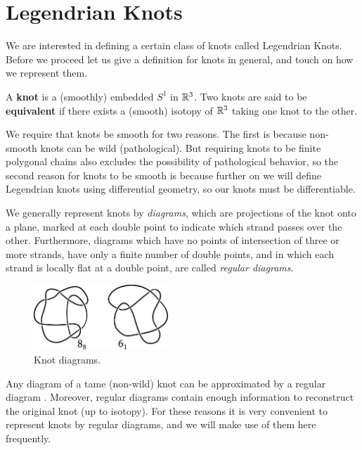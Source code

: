 \section{Legendrian Knots}

We are interested in defining a certain class of knots called Legendrian Knots. Before we proceed let us give a definition for knots in general, and touch on how we represent them.

\begin{defn}
    A \textbf{knot} is a (smoothly) embedded $S^1$ in $\mathbb{R}^3$. Two knots are said to be \textbf{equivalent} if there exists a (smooth) isotopy of $\mathbb{R}^3$ taking one knot to the other.
\end{defn}
We require that knots be smooth for two reasons. The first is because non-smooth knots can be wild (pathological).
But requiring knots to be finite polygonal chains also excludes the possibility of pathological behavior, so the second reason for knots to be smooth is because further on we will define Legendrian knots using differential geometry, so our knots must be differentiable. 

We generally represent knots by \emph{diagrams}, which are projections of the knot onto a plane, marked at each double point to indicate which strand passes over the other.
Furthermore, diagrams which have no points of intersection of three or more strands, have only a finite number of double points, and in which each strand is locally flat at a double point, are called \emph{regular diagrams}.

\begin{figure}[ht]
    \centering
    \includegraphics[width=0.45\textwidth]{images/smooth-knots.pdf}
    \caption{Knot diagrams.}%
    \label{fig:diagrams}
\end{figure}

Any diagram of a tame (non-wild) knot can be approximated by a regular diagram \cite{murasugi1996}.
Moreover, regular diagrams contain enough information to reconstruct the original knot (up to isotopy). For these reasons it is very convenient to represent knots by regular diagrams, and we will make use of them here frequently.

